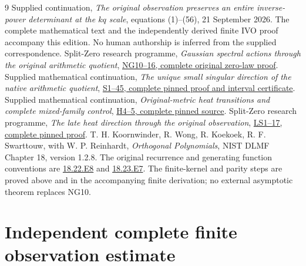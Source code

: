 \documentclass[11pt]{article}
\begin{document}
\begin{thebibliography}{9}
 Supplied continuation, \emph{The original observation
preserves an entire inverse-power determinant at the $kq$ scale},
equations (1)--(56), 21 September 2026. The complete mathematical text
and the independently derived finite IVO proof accompany this edition.
No human authorship is inferred from the supplied correspondence.
 Split-Zero research programme,
\emph{Gaussian spectral actions through the original arithmetic quotient},
\href{https://github.com/KokunoYumeto/zeta-function-research-reader/blob/5992ad50c0f2a06921f1fcaded7b4e38097c0739/workbenches/splitzero-tandem/continuations/20260920-original-kernel-mixed-determinants/providers/NATIVE_GAUSSIAN_TRANSFER.tex#L203}{NG10--16, complete original zero-law proof}.
 Supplied mathematical continuation,
\emph{The unique small singular direction of the native arithmetic quotient},
\href{https://github.com/KokunoYumeto/zeta-function-research-reader/blob/0fd693c844aad9117e30ec447c59864a28af10f3/workbenches/splitzero-tandem/continuations/20260921-native-spectral-real-pair/003/NATIVE_SMALLEST_SINGULAR_PROOF.tex}{S1--45, complete pinned proof and interval certificate}.
 Supplied mathematical continuation,
\emph{Original-metric heat transitions and complete mixed-family control},
\href{https://github.com/KokunoYumeto/zeta-function-research-reader/blob/0fd693c844aad9117e30ec447c59864a28af10f3/workbenches/splitzero-tandem/continuations/20260921-native-spectral-real-pair/003/RETAINED_PROFILE_PROOF.tex}{H4--5, complete pinned source}.
 Split-Zero research programme,
\emph{The late heat direction through the original observation},
\href{https://github.com/KokunoYumeto/zeta-function-research-reader/blob/0fd693c844aad9117e30ec447c59864a28af10f3/workbenches/splitzero-tandem/continuations/20260921-native-spectral-real-pair/003/LATE_HEAT_ORIGINAL_KERNEL_RECEIVER.tex}{LS1--17, complete pinned proof}.
 T. H. Koornwinder, R. Wong, R. Koekoek,
R. F. Swarttouw, with W. P. Reinhardt, \emph{Orthogonal Polynomials},
NIST DLMF Chapter 18, version 1.2.8.
The original recurrence and generating function conventions are
\href{https://dlmf.nist.gov/18.22.E8}{18.22.E8} and
\href{https://dlmf.nist.gov/18.23.E7}{18.23.E7}.
The finite-kernel and parity steps are proved above and in the
accompanying finite derivation; no external asymptotic theorem replaces NG10.
\end{thebibliography}
\clearpage\part{Independent complete finite observation estimate}
\end{document}
